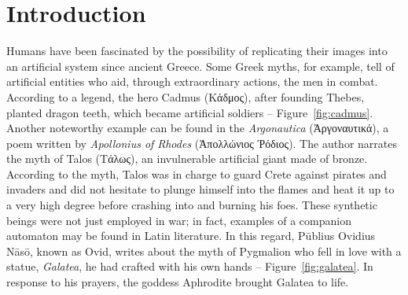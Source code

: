 \chapter{Introduction\label{chapter:introduction}}

\ifpdf
    \graphicspath{{chapter_introduction/figures/Raster/}{chapter_introduction/figures/PDF/}{chapter_introduction/figures/}}
\else
    \graphicspath{{chapter_introduction/figures/Vector/}{chapter_introduction/figures/}}
\fi

Humans have been fascinated by the possibility of replicating their images into an artificial system since ancient Greece.
Some Greek myths, for example, tell of artificial entities who aid, through extraordinary actions, the men in combat.
According to a legend, the hero Cadmus (\textgreek{Κάδμος}), after founding Thebes, planted dragon teeth, which became artificial soldiers -- Figure~\ref{fig:cadmus}. Another noteworthy example can be found in the \emph{Argonautica} (\textgreek{Ἀργοναυτικά}), a poem written by \emph{Apollonius of Rhodes} (\textgreek{Ἀπολλώνιος Ῥόδιος}). The author narrates the myth of Talos (\textgreek{Τάλως}), an invulnerable artificial giant made of bronze. 
According to the myth, Talos was in charge to guard Crete against pirates and invaders and did not hesitate to plunge himself into the flames and heat it up to a very high degree before crashing into and burning his foes.
These synthetic beings were not just employed in war; in fact, examples of a companion automaton may be found in Latin literature. In this regard, Pūblius Ovidius Nāsō, known as Ovid, writes about the myth of Pygmalion who fell in love with a statue, \emph{Galatea}, he had crafted with his own hands -- Figure~\ref{fig:galatea}. In response to his prayers, the goddess Aphrodite brought Galatea to life.
